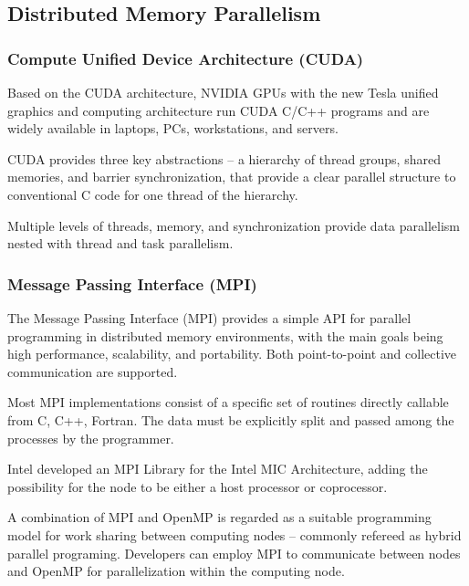 \documentclass[
  oneside,
  11pt, a4paper,
  footinclude=true,
  headinclude=true,
  cleardoublepage=empty
]{scrbook}
\begin{document}
\subsection{Distributed Memory Parallelism}

\subsubsection{Compute Unified Device Architecture (CUDA)}


Based on the CUDA architecture, NVIDIA GPUs
 with the new Tesla unified graphics and computing architecture run CUDA C/C++ programs and are widely available in laptops, PCs, workstations, and servers.\par 
 
CUDA provides three key abstractions --
a hierarchy of thread groups, shared memories, and barrier synchronization, that provide a clear parallel structure to conventional C code for one thread of the hierarchy.\par 

Multiple levels of threads, memory, and synchronization provide data parallelism nested with thread and task parallelism.\par 
 
 
\subsubsection{Message Passing Interface (MPI)}

The Message Passing Interface (MPI) provides a simple API for parallel programming in
distributed memory environments, with the main goals being high performance, scalability, and portability. 
Both point-to-point and collective communication are supported.\par 

Most MPI implementations consist of a specific set of routines directly callable from C, C++, Fortran. The data must be explicitly split and passed among the processes
by the programmer.\par 
Intel developed an MPI Library for the Intel MIC Architecture, adding the possibility for the node to be either a host processor or coprocessor.\par 


A combination of MPI  and OpenMP is regarded as a suitable programming model for work sharing between computing nodes -- commonly refereed as hybrid parallel programing. Developers can employ MPI to communicate between nodes and OpenMP for parallelization within the computing node.
\end{document}
